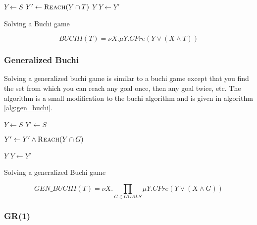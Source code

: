 \documentclass[a4paper,twoside,openright,11pt]{book}
\newcommand{\buchi}{Buchi }
\theoremstyle{definition}
\begin{document}
\begin{algorithm}[t]
\begin{algorithmic}
\State $Y \gets S$
\Loop
\State $Y' \gets \Call{Reach}{Y \cap T}$
\State\Return $Y$\EndIf
\State $Y \gets Y'$
\EndLoop
\EndFunction
\end{algorithmic}
\caption{Solving a \buchi game}
\label{a:buchi}
\end{algorithm}

\begin{equation}
BUCHI(T) = \nu X. \mu Y. CPre(Y \vee (X \wedge T))
\label{eqn:mu_buchi}
\end{equation}

\subsubsection{Generalized Buchi}

Solving a generalized buchi game is similar to a buchi game except that you find the set from which you can reach any goal once, then any goal twice, etc. The algorithm is a small modification to the buchi algorithm and is given in algorithm \ref{alg:gen_buchi}.

\begin{algorithm}[t]
\begin{algorithmic}
\State $Y \gets S$
\Loop
\State $Y' \gets S$

\State $Y' \gets Y' \wedge \Call{Reach}{Y \cap G}$
\EndFor

\State\Return $Y$\EndIf
\State $Y \gets Y'$

\EndLoop
\EndFunction
\end{algorithmic}
\caption{Solving a generalized \buchi game}
\label{alg:gen_buchi}
\end{algorithm}

\begin{equation}
    GEN\_BUCHI(T) = \nu X. \prod_{G \in GOALS} \mu Y. CPre(Y \vee (X \wedge G))
\label{eqn:mu_buchi}
\end{equation}

\subsubsection{GR(1)}
\end{document}
